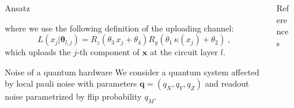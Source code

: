 \documentclass[20pt, final]{beamer}
\newlength{\sepwidth}
\newlength{\colwidth}
\newcommand{\separatorcolumn}{\begin{column}{\sepwidth}\end{column}}
\begin{document}
\begin{frame}[t]
\begin{columns}[t]
\begin{column}{\colwidth}
\begin{alertblock}{Ansatz}
\begin{figure} 
\label{fig:qpdf}
\end{figure}

where we use the following definition of the uploading channel:
\begin{equation}
L(x_j| \bm{\theta}_{l,j}) = R_z(\theta_3\,x_j + \theta_4) R_y(\theta_1\, \kappa(x_j) + \theta_2) \ ,
\label{eq:uploading_layer}
\end{equation}
which uploads the $j$-th component of $\bm{x}$ at the circuit layer $l$.
\end{alertblock}

\begin{block}{Noise of a quantum hardware}
We consider a quantum system affected by local pauli noise with parameters 
$\bm{q}=(q_X, q_Y, q_Z)$ and readout noise parametrized by flip probability $q_M$.
\end{block}

\end{column}

\begin{column}{\colwidth}

\vspace{-1cm}
\begin{block}{References}
  \nocite{*}
    \small  {}
  \end{block}
\end{column}

\separatorcolumn
\end{columns}
\end{frame}
\end{document}
